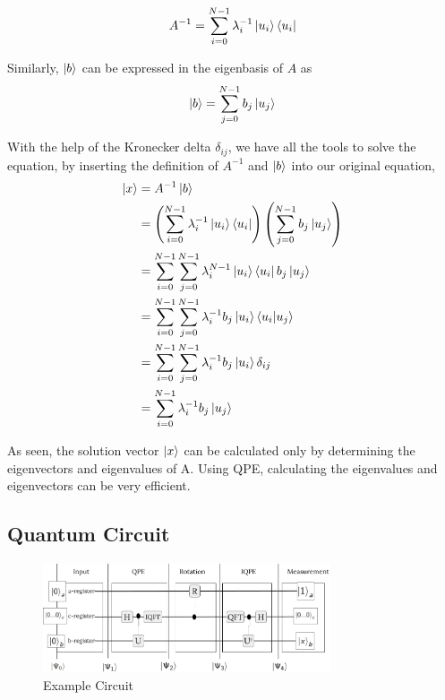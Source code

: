 \begin{equation}
A^{-1} = \sum_{i=0}^{N-1} \lambda_i^{-1} \ket{u_i}\bra{u_i}
\end{equation}

Similarly, $\ket b$ can be expressed in the eigenbasis of $A$ as 
\begin{equation}
\ket{b} = \sum_{j=0}^{N-1} b_j\ket{u_j}
\end{equation}

With the help of the Kronecker delta $\delta_{ij}$, we have all the tools to solve the equation, by inserting the definition of $A^{-1}$ and $\ket b$ into our original equation,
\begin{equation}
\begin{split}
\ket{x} &= A^{-1} \ket{b}\\
&=\left(\sum_{i=0}^{N-1} \lambda_i^{-1} \ket{u_i}\bra{u_i} \right) \left(\sum_{j=0}^{N-1} b_j\ket{u_j} \right) \\
&=\sum_{i=0}^{N-1} \sum_{j=0}^{N-1} \lambda_i^{N-1} \ket{u_i}\bra{u_i} b_j\ket{u_j}\\
&=\sum_{i=0}^{N-1} \sum_{j=0}^{N-1} \lambda_i^{-1} b_j\ket{u_i}\braket{u_i| u_j}\\
&=\sum_{i=0}^{N-1} \sum_{j=0}^{N-1} \lambda_i^{-1} b_j\ket{u_i}\delta_{ij}\\
&=\sum_{i=0}^{N-1} \lambda_i^{-1} b_j\ket{u_j}\\
\end{split}
\end{equation}

As seen, the solution vector $\ket x$ can be calculated only by determining the eigenvectors and eigenvalues of A. 
Using QPE, calculating the eigenvalues and eigenvectors can be very efficient.

\subsection{Quantum Circuit}

\begin{figure}
    \centering
    \includegraphics[width=8.5cm]{img/example_circuit_cropped.png}
    \caption{Example Circuit}
    \label{ex_circ}
\end{figure}

